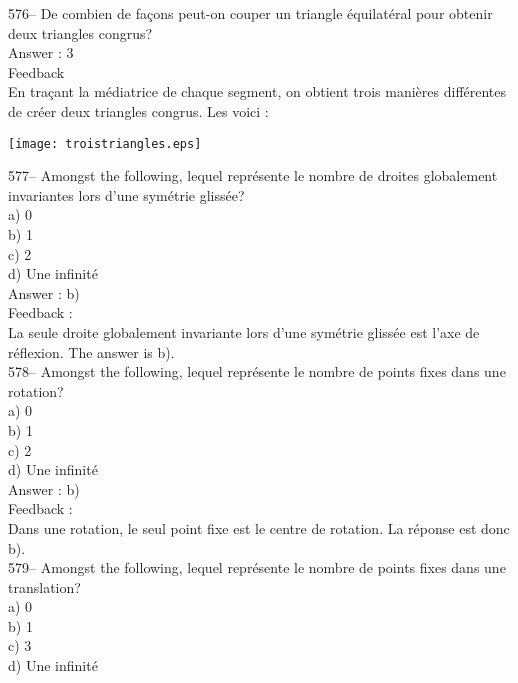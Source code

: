 ﻿\documentclass[letterpaper, 12pt]{article}
\begin{document}
576-- De combien de fa\c cons peut-on couper un triangle \'equilat\'eral
pour obtenir deux triangles congrus?\\

Answer : 3\\

Feedback\\
En tra\c cant la m\'ediatrice de chaque segment, on obtient trois mani\`eres
diff\'erentes de cr\'eer deux triangles congrus.  Les voici :\\
    \begin{center}
    \texttt{[image: troistriangles.eps]}
    \end{center}


577-- Amongst the following, lequel repr\'esente le nombre de
droites globalement invariantes lors d'une sym\'etrie gliss\'ee?\\
a) 0\\
b) 1\\
c) 2\\
d) Une infinit\'e\\

Answer : b)\\

Feedback : \\
La seule droite globalement invariante lors d'une sym\'etrie gliss\'ee est
l'axe de r\'eflexion.  The answer is b).\\

578-- Amongst the following, lequel repr\'esente le nombre de
points fixes dans une rotation?\\
a) 0\\
b) 1\\
c) 2\\
d) Une infinit\'e\\

Answer : b)\\

Feedback : \\
Dans une rotation, le seul point fixe est le centre de rotation.  La
r\'eponse est donc b).\\

579-- Amongst the following, lequel repr\'esente le nombre de
points fixes dans une translation?\\
a) 0 \\
b) 1\\
c) 3\\
d) Une infinit\'e\\
\end{document}
